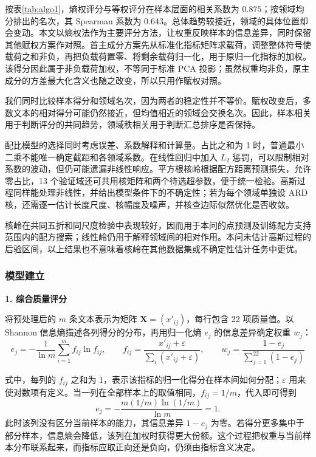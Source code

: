 按表\ref{tab:algo1}，熵权评分与等权评分在样本层面的相关系数为 $0.875$；按领域均分排出的名次，其 Spearman 系数为 $0.643$。总体趋势较接近，领域的具体位置却会变动。本文以熵权法作为主要评分方法，让权重反映样本的信息差异，同时保留其他赋权方案作对照。首主成分方案先从标准化指标矩阵求载荷，调整整体符号使载荷之和非负，再把负载荷置零、将剩余载荷归一化，用于原归一化指标的加权。该得分因此属于非负载荷加权，不等同于标准 PCA 投影；虽然权重均非负，原主成分的方差最大化含义也随之改变，所以只用作赋权对照。

我们同时比较样本得分和领域名次，因为两者的稳定性并不等价。赋权改变后，多数文本的相对得分可能仍然接近，但均值相近的领域会交换名次。因此，样本相关用于判断评分的共同趋势，领域秩相关用于判断汇总排序是否保持。

配比模型的选择同时考虑误差、系数解释和计算量。占比之和为 1 时，普通最小二乘不能唯一确定截距和各领域系数。在线性回归中加入 $L_2$ 惩罚，可以限制相对系数的波动，但仍可能遗漏非线性响应。平方根核岭根据配方距离预测损失，允许零占比，13 个验证域还可共用核矩阵和两个待选超参数，便于统一检验。高斯过程同样能处理非线性，并给出模型条件下的不确定性；若为每个领域单独设 ARD 核，还需逐一估计长度尺度、核幅度及噪声，并核查边际似然优化是否收敛。

核岭在共同五折和同尺度检验中表现较好，因而用于本问的点预测及训练配方支持范围内的配方搜索；线性岭仍用于解释领域间的相对作用。本问未估计高斯过程的后验区间，以上结果也不意味着核岭在其他数据集或不确定性估计任务中更优。



\subsubsection{模型建立}

\textbf{1. 综合质量评分}\par\nopagebreak[4]

将预处理后的 $m$ 条文本表示为矩阵 $\bm X=(x'_{ij})$，每行包含 22 项质量值。以 Shannon 信息熵\cite{shannon1948}描述各列得分的分布，再用归一化熵 $e_j$ 的信息差异确定权重 $w_j$：
\begin{equation}
    e_j = -\frac{1}{\ln m}\sum_{i=1}^{m} f_{ij}\ln f_{ij},\qquad f_{ij}=\frac{x'_{ij}+\varepsilon}{\sum_i (x'_{ij}+\varepsilon)},\qquad
    w_j = \frac{1-e_j}{\sum_{j=1}^{22}(1-e_j)}
\end{equation}

式中，每列的 $f_{ij}$ 之和为 1，表示该指标的归一化得分在样本间如何分配；$\varepsilon$ 用来使对数项有定义。当一列在全部样本上的取值相同，$f_{ij}=1/m$，代入即可得到
\[
 e_j=-\frac{m(1/m)\ln(1/m)}{\ln m}=1.
\]
此时该列没有区分当前样本的能力，其信息差异 $1-e_j$ 为零。若得分更多集中于部分样本，信息熵会降低，该列在加权时获得更大份额。这个过程把权重与当前样本分布联系起来，而指标应取正向还是负向，仍须由指标含义决定。

